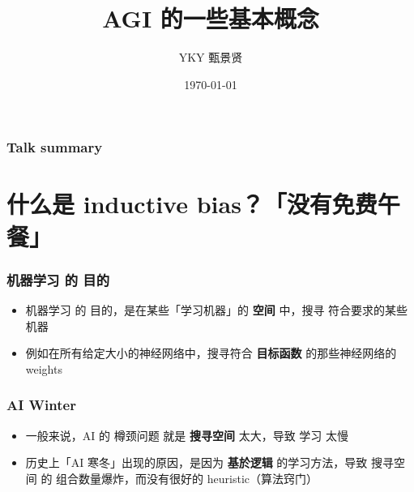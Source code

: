 \documentclass[17pt]{beamer}
\title[China AGI group]{AGI 的一些基本概念} %
\author{YKY 甄景贤} %
\institute[] %
{
Independent researcher, Hong Kong \\ %
\medskip
\textit{generic.intelligence@gmail.com} %
}
\date{\today} %
\begin{document}
\frame{\titlepage}

\begin{frame}
\frametitle{Talk summary}
\tableofcontents
\end{frame}

%
%




\section{什么是 inductive bias？「没有免费午餐」}
\frame{\sectionpage}

\begin{frame}
\frametitle{机器学习 的 目的}
\begin{itemize}
	\item 机器学习 的 目的，是在某些「学习机器」的 \textbf{空间} 中，搜寻 符合要求的某些机器
	\item 例如在所有给定大小的神经网络中，搜寻符合 \textbf{目标函数} 的那些神经网络的 weights
\end{itemize}
\end{frame}

\begin{frame}
\frametitle{AI Winter}
\begin{itemize}
	\item 一般来说，AI 的 樽颈问题 就是 \textbf{搜寻空间} 太大，导致 学习 太慢
	\item 历史上「AI 寒冬」出现的原因，是因为 \textbf{基於逻辑} 的学习方法，导致 搜寻空间 的 组合数量爆炸，而没有很好的 heuristic（算法窍门）
\end{itemize}
\end{frame}
\end{document}
